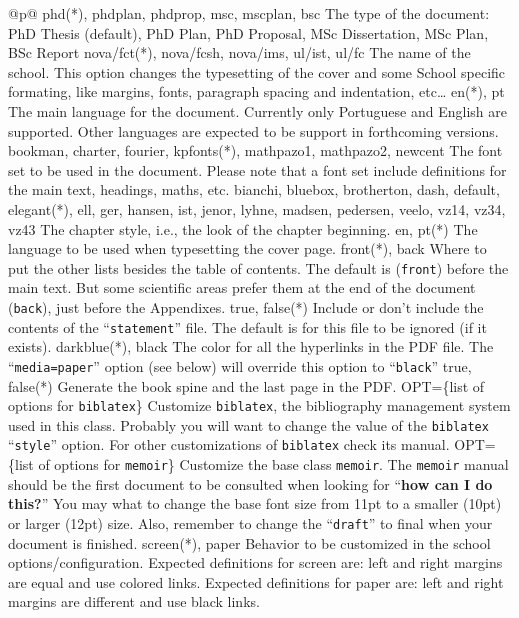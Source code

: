 \noindent
\begin{ctabular}{@{}p{\linewidth}@{}}
  \toprule
  {phd(*), phdplan, phdprop, msc, mscplan, bsc}%
  {The type of the document: PhD Thesis (default), PhD Plan, PhD Proposal, MSc Dissertation, MSc Plan, BSc Report}
  \midrule
  {nova/fct(*), nova/fcsh, nova/ims, ul/ist, ul/fc}%
  {The name of the school. This option changes the typesetting of the cover and some School specific formating, like margins, fonts, paragraph spacing and indentation, etc…}
  \midrule
  {en(*), pt}%
  {The main language for the document.  Currently only Portuguese and English are supported.  Other languages are expected to be support in forthcoming versions.}
  \midrule
  {bookman, charter, fourier, kpfonts(*), mathpazo1, mathpazo2, newcent}%
  {The font set to be used in the document.  Please note that a font set include definitions for the main text, headings, maths, etc.}
  \midrule
  {bianchi, bluebox, brotherton, dash, default, elegant(*), ell, ger, hansen, ist, jenor, lyhne, madsen, pedersen, veelo, vz14, vz34, vz43}%
  {The chapter style, i.e., the look of the chapter beginning.}
  \midrule
  {en, pt(*)}%
  {The language to be used when typesetting the cover page.}
  \midrule
  {front(*), back}%
  {Where to put the other lists besides the table of contents. The default is (\texttt{front}) before the main text.  But some scientific areas prefer them at the end of the document (\texttt{back}), just before the Appendixes.}
  \midrule
  {true, false(*)}%
  {Include or don't include the contents of the “\texttt{statement}” file. The default is for this file to be ignored (if it exists).}
  \midrule
  {darkblue(*), black}%
  {The color for all the hyperlinks in the PDF file.  The “\texttt{media=paper}” option (see below) will override this option to “\texttt{black}”}
  \midrule
  {true, false(*)}%
  {Generate the book spine and the last page in the PDF.}
  \midrule
  {OPT=\{list of options for \texttt{biblatex}\}}%
  {Customize \texttt{biblatex}, the bibliography management system used in this class. Probably you will want to change the value of the \texttt{biblatex} “\texttt{style}” option. For other customizations of \texttt{biblatex} check its manual.}
  \midrule
  {OPT=\{list of options for \texttt{memoir}\}}%
  {Customize the base class \texttt{memoir}. The \texttt{memoir} manual should be the first document to be consulted when looking for “\textbf{how can I do this?}” You may what to change the base font size from 11pt to a smaller (10pt) or larger (12pt) size.  Also, remember to change the “\texttt{draft}” to final when your document is finished.}
  \midrule
  {screen(*), paper}%
  {Behavior to be customized in the school options/configuration. Expected definitions for screen are: left and right margins are equal and use colored links. Expected definitions for paper are: left and right margins are different and use black links.}
  \bottomrule
\end{ctabular}

